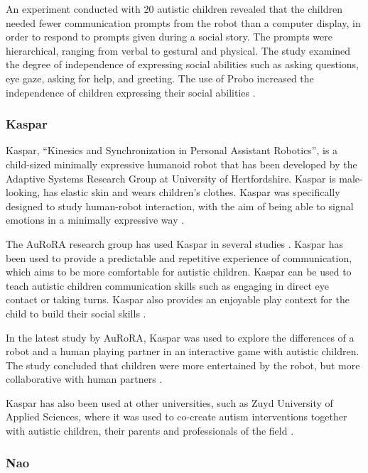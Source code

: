 An experiment conducted with 20 autistic children revealed that the children needed fewer communication prompts from the robot than a computer display, in order to respond to prompts given during a social story. The prompts were hierarchical, ranging from verbal to gestural and physical. The study examined the degree of independence of expressing social abilities such as asking questions, eye gaze, asking for help, and greeting. The use of Probo increased the independence of children expressing their social abilities \cite{pop2013social}.


\subsubsection{Kaspar}

Kaspar, “Kinesics and Synchronization in Personal Assistant Robotics”, is a child-sized minimally expressive humanoid robot that has been developed by the Adaptive Systems Research Group at University of Hertfordshire. Kaspar is male-looking, has elastic skin and wears children's clothes. Kaspar was specifically designed to study human-robot interaction, with the aim of being able to signal emotions in a minimally expressive way \cite{dautenhahn2009kaspar}.

The AuRoRA research group has used Kaspar in several studies \cite{auroraProject}. Kaspar has been used to provide a predictable and repetitive experience of communication, which aims to be more comfortable for autistic children. Kaspar can be used to teach autistic children communication skills such as engaging in direct eye contact or taking turns. Kaspar also provides an enjoyable play context for the child to build their social skills \cite{kasparImpact}.

In the latest study by AuRoRA, Kaspar was used to explore the differences of a robot and a human playing partner in an interactive game with autistic children. The study concluded that children were more entertained by the robot, but more collaborative with human partners \cite{wainer2014pilot}.

Kaspar has also been used at other universities, such as Zuyd University of Applied Sciences, where it was used to co-create autism interventions together with autistic children, their parents and professionals of the field \cite{huijnen2017implement}. 


\subsubsection{Nao}

